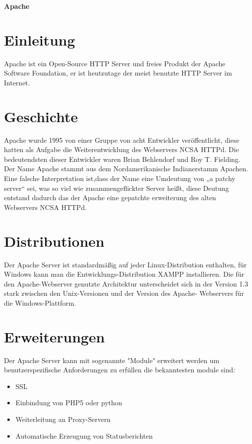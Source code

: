 
\begin{center}
\textbf{\LARGE{Apache}}
\end{center}


\section{Einleitung}
Apache ist ein Open-Source HTTP Server und freies Produkt der Apache Software Foundation, er ist heutzutage der meist benutzte HTTP Server  im Internet.

\section{Geschichte}
Apache wurde 1995 von einer Gruppe von acht Entwickler veröffentlicht, diese hatten als Aufgabe die Weiterentwicklung des  Webservers NCSA HTTPd. Die bedeutendsten dieser Entwickler waren Brian Behlendorf und Roy T. Fielding.
Der Name Apache stammt aus dem Nordamerikanische Indianerstamm Apachen. Eine falsche Interpretation ist,dass der Name eine Umdeutung von „a patchy server“ sei, was so viel wie zusammengeflickter Server heißt, diese Deutung entstand dadurch das der Apache eine gepatchte erweiterung des alten Webservers NCSA HTTPd.

\section{Distributionen}
Der Apache Server ist standardmäßig auf jeder Linux-Distribution enthalten, für Windows kann man die Entwicklungs-Distribution XAMPP installieren. Die für den Apache-Webserver genutzte Architektur unterscheidet sich in der 
Version 1.3 stark zwischen den Unix-Versionen und der Version des Apache-
Webservers für die Windows-Plattform.

\section{Erweiterungen}
Der Apache Server kann mit sogenannte "Module" erweitert werden um benutzerspezifische
Anforderungen zu erfüllen die bekanntesten module sind: 
\begin{itemize}
\item{SSL}
\item{Einbindung von PHP5 oder python}
\item{Weiterleitung an Proxy-Servern}
\item{Automatische Erzeugung von Statusberichten}
\end{itemize}



